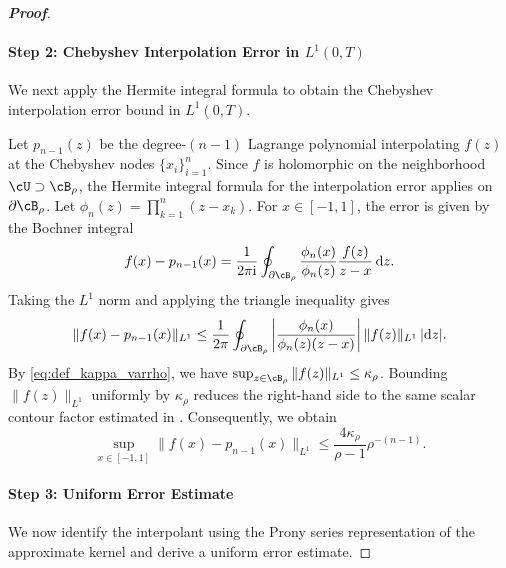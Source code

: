 \begin{proof}[\bf Proof]
\paragraph{Step 2: Chebyshev Interpolation Error in $L^1(0,T)$}
We next apply the Hermite integral formula to obtain the Chebyshev interpolation error bound in $L^1(0,T)$.

Let $p_{n-1}(z)$ be the degree-$(n-1)$ Lagrange polynomial interpolating $f(z)$ at the Chebyshev nodes $\{x_i\}_{i=1}^n$. Since $f$ is holomorphic on the neighborhood $\cU\supset\cB_{\rho}$, the Hermite integral formula \cite[Chapter 11]{trefethen2019approximation} for the interpolation error applies on $\partial\cB_{\rho}$. Let $\phi_n(z) = \prod_{k=1}^n (z-x_k)$. For $x\in[-1,1]$, the error is given by the Bochner integral
\begin{equation*}
f(x) - p_{n-1}(x) = \frac{1}{2\pi \mathrm{i}} \oint_{\partial\cB_\rho} \frac{\phi_n(x)}{\phi_n(z)} \frac{f(z)}{z - x} \,\mathrm{d}z.
\end{equation*}
Taking the $L^1$ norm and applying the triangle inequality gives
\begin{equation*}
\|f(x) - p_{n-1}(x)\|_{L^1}
\le
\frac{1}{2\pi} \oint_{\partial\cB_\rho} \left| \frac{\phi_n(x)}{\phi_n(z)(z - x)} \right| \|f(z)\|_{L^1} \,|\mathrm{d}z|.
\end{equation*}
By \cref{eq:def_kappa_varrho}, we have $\sup_{z \in \cB_\rho} \|f(z)\|_{L^1} \le \kappa_\rho$. Bounding $\|f(z)\|_{L^1}$ uniformly by $\kappa_\rho$ reduces the right-hand side to the same scalar contour factor estimated in \cite[Theorem 8.2]{trefethen2019approximation}. Consequently, we obtain
\begin{equation}\label{eq:chebyshev_interp_bound_iv}
\sup_{x\in[-1,1]}\|f(x)-p_{n-1}(x)\|_{L^1}
\leq
\frac{4\kappa_{\rho}}{\rho-1}\rho^{-(n-1)}.
\end{equation}

\paragraph{Step 3: Uniform Error Estimate}
We now identify the interpolant using the Prony series representation of the approximate kernel and derive a uniform error estimate.


\end{proof}
